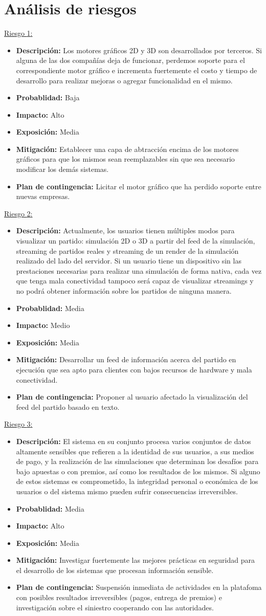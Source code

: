 \documentclass[a4paper, 10pt, twoside]{article}
\newcommand{\riesgo}[7]{
  \underline{Riesgo {#1}:}
  \begin{itemize}   
    \item \textbf{Descripción:} {#2}
    \item \textbf{Probablidad:} {#3}
    \item \textbf{Impacto:} {#4}
    \item \textbf{Exposición:} {#5}
    \item \textbf{Mitigación:} {#6}
    \item \textbf{Plan de contingencia:} {#7}
  \end{itemize}
}
\begin{document}

\section{Análisis de riesgos}
\label{riesgos:r1}
\riesgo{1}
    { Los motores gráficos 2D y 3D son desarrollados por terceros. Si alguna de las dos compañías deja de funcionar, perdemos soporte para el correspondiente motor gráfico e incrementa fuertemente el costo y tiempo de desarrollo para realizar mejoras o agregar funcionalidad en el mismo. }
    {Baja} %
    {Alto} %
    {Media} %
    {Establecer una capa de abtracción encima de los motores gráficos para que los mismos sean reemplazables sin que sea necesario modificar los demás sistemas.} %
    {Licitar el motor gráfico que ha perdido soporte entre nuevas empresas.} %

\riesgo{2}
    {Actualmente, los usuarios tienen múltiples modos para visualizar un partido: simulación 2D o 3D a partir del feed de la simulación, streaming de partidos reales y streaming de un render de la simulación realizado del lado del servidor. Si un usuario tiene un dispositivo sin las prestaciones necesarias para realizar una simulación de forma nativa, cada vez que tenga mala conectividad tampoco será capaz de visualizar streamings y no podrá obtener información sobre los partidos de ninguna manera. }
    {Media} %
    {Medio} %
    {Media} %
    {Desarrollar un feed de información acerca del partido en ejecución que sea apto para clientes con bajos recursos de hardware y mala conectividad.}
    {Proponer al usuario afectado la visualización del feed del partido basado en texto.}

\riesgo{3}
    {El sistema en su conjunto procesa varios conjuntos de datos altamente sensibles que refieren a la identidad de sus usuarios, a sus medios de pago, y la realización de las simulaciones que determinan los desafíos para bajo apuestas o con premios, así como los resultados de los mismos. Si alguno de estos sistemas es comprometido, la integridad personal o económica de los usuarios o del sistema mismo pueden sufrir consecuencias irreversibles. }
    {Media} %
    {Alto} %
    {Media} %
    {Investigar fuertemente las mejores prácticas en seguridad para el desarrollo de los sistemas que procesan información sensible.}
    {Suspensión inmediata de actividades en la platafoma con posibles resultados irreversibles (pagos, entrega de premios) e investigación sobre el siniestro cooperando con las autoridades.}

\newpage



\end{document}
